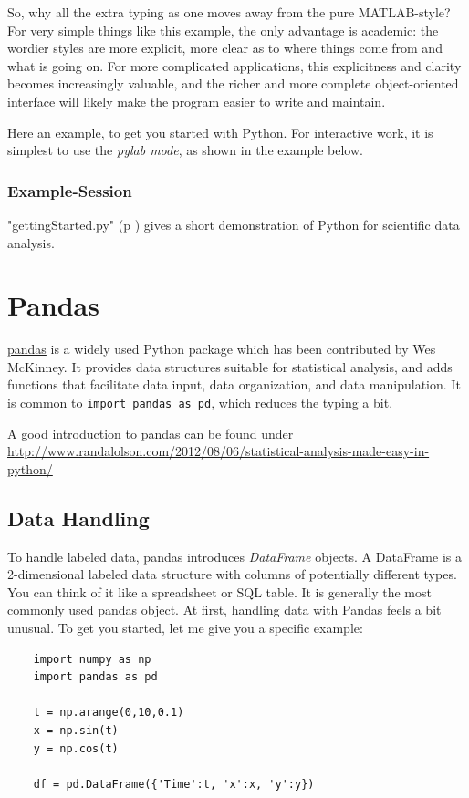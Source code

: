 So, why all the extra typing as one moves away from the pure MATLAB-style? For very simple things like this example, the only advantage is academic: the wordier styles are more explicit, more clear as to where things come from and what is going on. For more complicated applications, this explicitness and clarity becomes increasingly valuable, and the richer and more complete object-oriented interface will likely make the program easier to write and maintain.

Here an example, to get you started with Python. For interactive work, it is
simplest to use the \emph{pylab mode}, as shown in the example below.

\subsubsection{Example-Session}

\PyImg "gettingStarted.py" (p \pageref{py:gettingStarted_ipy}) gives a short demonstration of Python for scientific data analysis.


\section{Pandas}

\href{http://pandas.pydata.org/.}{pandas} is a widely used Python package which has been contributed by Wes McKinney. It provides data structures suitable for statistical analysis, and adds functions that facilitate
data input, data organization, and data manipulation. It is common to \lstinline{import pandas as pd}, which reduces the typing a bit.

A good introduction to pandas can be found under
\url{http://www.randalolson.com/2012/08/06/statistical-analysis-made-easy-in-python/}

\subsection{Data Handling}


To handle labeled data, pandas introduces \emph{DataFrame} objects. A DataFrame is a 2-dimensional labeled data structure with columns of potentially different types. You can think of it like a spreadsheet or SQL table. It is generally the most commonly used pandas object.
At first, handling data with Pandas feels a bit unusual. To get you started, let me give you a specific example:

\begin{lstlisting}
    import numpy as np
    import pandas as pd

    t = np.arange(0,10,0.1)
    x = np.sin(t)
    y = np.cos(t)

    df = pd.DataFrame({'Time':t, 'x':x, 'y':y})
\end{lstlisting}

